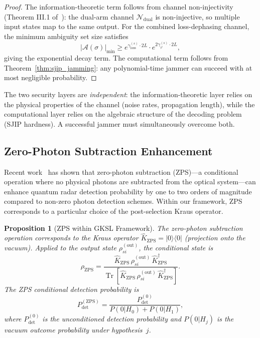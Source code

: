 \documentclass[journal]{IEEEtran}
\newtheorem{proposition}{Proposition}
\DeclareMathOperator{\Tr}{Tr}
\begin{document}
\begin{proof}
The information-theoretic term follows from channel non-injectivity (Theorem III.1 of~\cite{gautum2024rigorous}): the dual-arm channel $\mathcal{N}_{\text{dual}}$ is non-injective, so multiple input states map to the same output. For the combined loss-dephasing channel, the minimum ambiguity set size satisfies
\begin{equation}
|\mathcal{A}(\sigma)|_{\min} \geq e^{\gamma_{\text{loss}}^{(s)} \cdot 2L} \cdot e^{2\gamma_\varphi^{(s)} \cdot 2L},
\end{equation}
giving the exponential decay term. The computational term follows from Theorem~\ref{thm:sjip_jamming}: any polynomial-time jammer can succeed with at most negligible probability.
\end{proof}

The two security layers are \textit{independent}: the information-theoretic layer relies on the physical properties of the channel (noise rates, propagation length), while the computational layer relies on the algebraic structure of the decoding problem (SJIP hardness). A successful jammer must simultaneously overcome both.

\subsection{Zero-Photon Subtraction Enhancement}

Recent work~\cite{zhao2025quantum} has shown that zero-photon subtraction (ZPS)---a conditional operation where no physical photons are subtracted from the optical system---can enhance quantum radar detection probability by one to two orders of magnitude compared to non-zero photon detection schemes. Within our framework, ZPS corresponds to a particular choice of the post-selection Kraus operator.

\begin{proposition}[ZPS within GKSL Framework]\label{prop:zps}
The zero-photon subtraction operation corresponds to the Kraus operator $\hat{K}_{\text{ZPS}} = |0\rangle\langle 0|$ (projection onto the vacuum). Applied to the output state $\rho_{si}^{(\text{out})}$, the conditional state is
\begin{equation}\label{eq:zps_state}
\rho_{\text{ZPS}} = \frac{\hat{K}_{\text{ZPS}}\,\rho_{si}^{(\text{out})}\,\hat{K}_{\text{ZPS}}^\dagger}{\Tr[\hat{K}_{\text{ZPS}}\,\rho_{si}^{(\text{out})}\,\hat{K}_{\text{ZPS}}^\dagger]}.
\end{equation}
The ZPS conditional detection probability is
\begin{equation}\label{eq:zps_prob}
P_{\text{det}}^{(\text{ZPS})} = \frac{P_{\text{det}}^{(0)}}{P(0|H_0) + P(0|H_1)},
\end{equation}
where $P_{\text{det}}^{(0)}$ is the unconditioned detection probability and $P(0|H_j)$ is the vacuum outcome probability under hypothesis~$j$.
\end{proposition}
\end{document}
